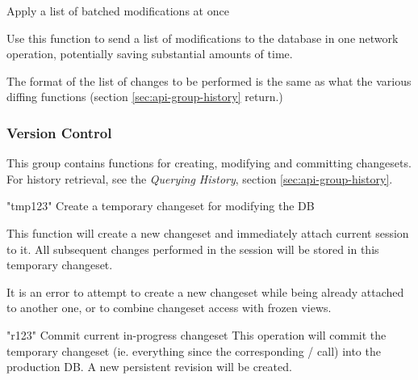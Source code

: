 \documentclass{article}
\begin{document}
    {}
    {Apply a list of batched modifications at once}
    {Use this function to send a list of modifications to the database in one network operation, potentially saving
    substantial amounts of time.

    The format of the list of changes to be performed is the same as what the various diffing functions (section
    \ref{sec:api-group-history} return.)
    }

\subsubsection{Version Control}
\label{sec:api-group-vcs}

This group contains functions for creating, modifying and committing changesets.  For history retrieval, see the {\em
Querying History}, section \ref{sec:api-group-history}.

    {"tmp123"}
    {Create a temporary changeset for modifying the DB}
    {This function will create a new changeset and immediately attach current session to it.  All subsequent changes
    performed in the session will be stored in this temporary changeset.

    It is an error to attempt to create a new changeset while being already attached to another one, or to combine
    changeset access with frozen views.
    }

    {"r123"}
    {Commit current in-progress changeset}
    {This operation will commit the temporary changeset (ie. everything since the corresponding
    / call) into the production DB.  A new persistent
    revision will be created.}
\end{document}

